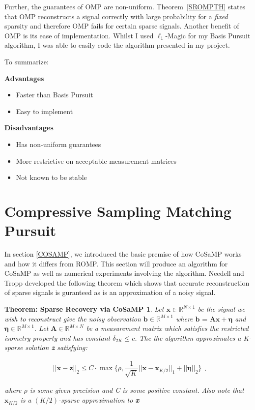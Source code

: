\documentclass[titlepage,oneside, 12pt]{book}
\theoremstyle{break}
\begin{document}
Further, the guarantees of OMP are non-uniform. Theorem~\ref{SROMPTH} states that OMP reconstructs a signal correctly with large probability for a \textit{fixed} sparsity and therefore OMP fails for certain sparse signals. Another benefit of OMP is its ease of implementation. Whilst I used $\ell_1$-Magic for my Basis Pursuit algorithm, I was able to easily code the algorithm presented in my project. 

\begin{flushleft}
To summarize:
\end{flushleft}

\textbf{Advantages}
\begin{itemize}
\item Faster than Basis Pursuit
\item Easy to implement
\end{itemize}

\textbf{Disadvantages}
\begin{itemize}
\item Has non-uniform guarantees
\item More restrictive on acceptable measurement matrices
\item Not known to be stable
\end{itemize}

\newpage


\section{Compressive Sampling Matching Pursuit}

In section \ref{COSAMP}, we introduced the basic premise of how CoSaMP works and how it differs from ROMP. This section will produce an algorithm for CoSaMP as well as numerical experiments involving the algorithm. Needell and Tropp developed the following theorem which shows that accurate reconstruction of sparse signals is guranteed as is an approximation of a noisy signal\cite{CoSaMP}.


\newtheorem*{temp}{Theorem: Sparse Recovery via CoSaMP}\label{SRCOSAMP}
\begin{temp}
Let $\textbf{x} \in \mathbb{R}^{N \times 1}$ be the signal we wish to reconstruct give the noisy observation $\textbf{b} \in \mathbb{R}^{M \times 1}$ where $\textbf{b = Ax} + \pmb{\eta}$ and $\pmb{\eta} \in \mathbb{R}^{M \times 1}$. Let $\textbf{A} \in \mathbb{R}^{M \times N}$ be a measurement matrix which satisfies the restricted isometry property and has constant $\delta_{2K} \leq c$. The the algorithm approximates a K-sparse solution \textbf{z} satisfying:

\begin{equation}
\begin{gathered}
||\textbf{x} - \textbf{z}||_2 \leq C \cdot \max\bigg\{\rho, \dfrac{1}{\sqrt{K}}||\textbf{x} - \textbf{x}_{K/2}||_1 + ||\pmb{\eta}||_2 \bigg\}
\end{gathered}.
\end{equation}

where $\rho$ is some given precision and C is some positive constant. Also note that $\textbf{x}_{K/2}$ is a $(K/2)$-sparse approximation to \textbf{x} 

\end{temp}
\end{document}
